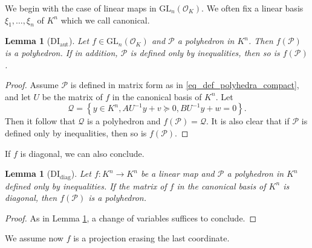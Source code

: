 \documentclass{elsarticle}
\theoremstyle{plain}
\newtheorem{lemma}[theorem]{Lemma}
\theoremstyle{definition}
\newcommand{\PP}{\mathcal{P}}
\newcommand{\Qc}{\mathcal{Q}}
\newcommand{\OK}{\mathcal{O}_K}
\newcommand{\GL}{\mathrm{GL}}
\begin{document}
We begin with the case of linear maps in $\GL_n(\OK)$.
We often fix a linear basis $\xi_1,\ldots,\xi_n$ of $K^n$ which we call canonical.

\begin{lemma}[DI${}_{\mathrm{aut}}$]
Let $f \in \GL_n(\OK)$ and $\PP$ a polyhedron in $K^n$.
Then $f(\PP)$ is a polyhedron. \label{lem:DIaut}
If in addition, $\PP$ is defined only by inequalities,
then so is $f(\PP)$.
\end{lemma}
\begin{proof}
  Assume $\PP$ is defined in matrix form as in \eqref{eq_def_polyhedra_compact},
  and let $U$ be the matrix of
  $f$ in the canonical basis of $K^n$. Let
  \[\Qc=\left\lbrace y \in K^n,  AU^{-1} y+v \succeq 0, BU^{-1} y+w=0 \right\rbrace.\]
  Then it follow that $\Qc$ is a polyhedron and $f(\PP)=\Qc.$
  It is also clear that if $\PP$ is defined only by inequalities,
  then so is $f(\PP)$.
\end{proof}

If $f$ is diagonal, we can also conclude.

\begin{lemma}[DI${}_{\mathrm{diag}}$]
  Let $f : K^n \to K^n$ be a linear map and $\PP$ a polyhedron in $K^n$ defined only by inequalities.
  If the matrix of $f$ in the canonical basis of $K^n$ is diagonal,
  then $f(\PP)$ is a polyhedron. \label{lem:DIdiag}
\end{lemma}
\begin{proof}
As in Lemma \ref{lem:DIaut}, a change of variables suffices to conclude.
\end{proof}

We assume now $f$ is a projection erasing the last coordinate.
\end{document}

